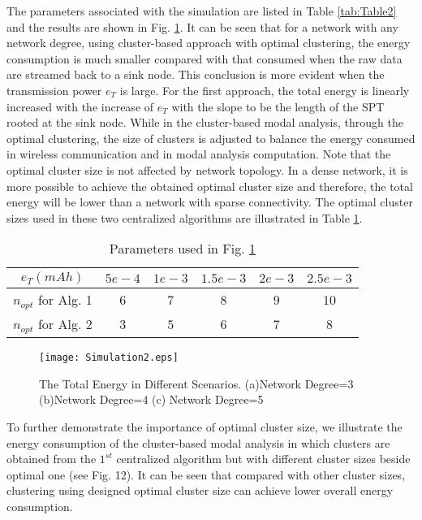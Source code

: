 The parameters associated with the simulation are listed in Table \ref{tab:Table2} and the results are shown in Fig. \ref{fig:Simulation2}. It can be seen that for a network with any network degree, using cluster-based approach with optimal clustering, the energy consumption is much smaller compared with that consumed when the raw data are streamed back to a sink node. This conclusion is more evident when the transmission power \(e_T\) is large. For the first approach, the total energy is linearly increased with the increase of \(e_T\) with the slope to be the length of the SPT rooted at the sink node. While in the cluster-based modal analysis, through the optimal clustering, the size of clusters is adjusted to balance the energy consumed in wireless communication and in modal analysis computation. Note that the optimal cluster size is not affected by network topology. In a dense network, it is more possible to achieve the obtained optimal cluster size and therefore, the total energy will be lower than a network with sparse connectivity. The optimal cluster sizes used in these two centralized algorithms are illustrated in Table \ref{tab:simulation}. 
\begin{table}
	\centering
\begin{tabular}{|c|c|c|c|c|c|}
\hline
\(e_T(mAh)\)&\(5e-4\)&\(1e-3\)&\(1.5e-3\)&\(2e-3\)&\(2.5e-3\)\\
\hline
\(n_{opt}\) for Alg. 1&\(6\)&\(7\)&\(8\)&\(9\)&\(10\)\\
\hline
\(n_{opt}\) for Alg. 2&\(3\) &\(5\)&\(6\)&\(7\)&\(8\)\\
\hline
\end{tabular}
	\caption{Parameters used in Fig. \ref{fig:Simulation2}}
	\label{tab:simulation}
\end{table}

\begin{figure}
	\centering
		\texttt{[image: Simulation2.eps]}
	\caption{The Total Energy in Different Scenarios. (a)Network Degree=3 (b)Network Degree=4 (c) Network Degree=5}
	\label{fig:Simulation2}
\end{figure}

To further demonstrate the importance of optimal cluster size, we illustrate the energy consumption of the cluster-based modal analysis in which clusters are obtained from the \(1^{st}\) centralized algorithm but with different cluster sizes beside optimal one (see Fig. 12). It can be seen that compared with other cluster sizes, clustering using designed optimal cluster size can achieve lower overall energy consumption. 

